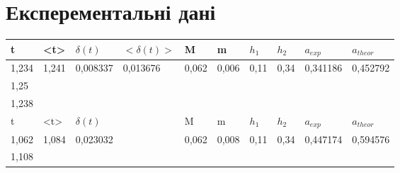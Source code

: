\documentclass[a4paper,12pt]{article}
\begin{document}
\section{Експерементальні дані}
\begin{table}[htp]
\begin{tabular}{@{}|l|l|l|l|l|l|l|l|l|l|@{}}
\toprule
t     & \textless{}t\textgreater{} & $\delta(t)$               & $<\delta(t)>$              & M                      & m                      & $h_1$                 & $h_2$                 & \multicolumn{1}{l}{$a_{exp}$}                 & $a_{theor}$                                   \\ \midrule
1,234 & \multirow{3}{*}{1,241}     & \multirow{3}{*}{0,008337} & \multirow{27}{*}{0,013676} & \multirow{3}{*}{0,062} & \multirow{3}{*}{0,006} & \multirow{3}{*}{0,11} & \multirow{3}{*}{0,34} & \multirow{3}{*}{0,341186}                     & \multirow{3}{*}{0,452792}                     \\
1,25  &                            &                           &                            &                        &                        &                       &                       &                                               &                                               \\
1,238 &                            &                           &                            &                        &                        &                       &                       &                                               &                                               \\\hline
t     & \textless{}t\textgreater{} & $\delta(t)$               &                            & M                      & m                      & $h_1$                 & $h_2$                 & \multicolumn{1}{l}{$a_{exp}$}                 & $a_{theor}$                                   \\\hline
1,062 & \multirow{3}{*}{1,084}     & \multirow{3}{*}{0,023032} &                            & \multirow{3}{*}{0,062} & \multirow{3}{*}{0,008} & \multirow{3}{*}{0,11} & \multirow{3}{*}{0,34} & \multirow{3}{*}{0,447174}                     & \multicolumn{1}{r}{\multirow{3}{*}{0,594576}} \\
1,108 &                            &                           &                            &                        &                        &                       &                       &                                               & \multicolumn{1}{r}{}                          \\

\end{tabular}
\end{table}
\end{document}
